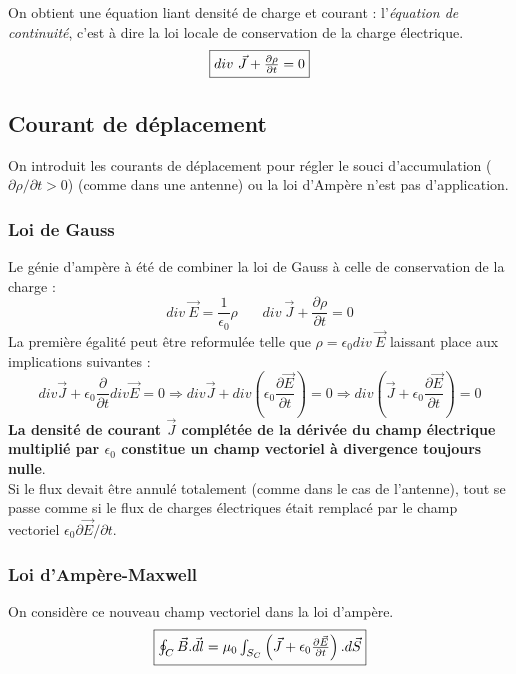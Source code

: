 \documentclass	[11pt, a4paper, openany]{book}
\begin{document}
On obtient une équation liant densité de charge et courant : l'\textit{équation de continuité}, c'est à dire la loi locale de conservation de la charge électrique.
\begin{equation}
\fbox{$div\ \vec{J} + \frac{\partial \rho}{\partial t} = 0 $}
\end{equation}

\subsection{Courant de déplacement}
On introduit les courants de déplacement pour régler le souci d'accumulation ($\partial\rho /  \partial t > 0$) (comme dans une antenne) ou la loi d'Ampère n'est pas d'application.

\subsubsection{Loi de Gauss}
Le génie d'ampère à été de combiner la loi de Gauss à celle de conservation de la charge : 
\begin{equation}
div\ \vec{E} = \frac{1}{\epsilon_0}\rho\ \ \ \ \ \ \ \ div\ \vec{J} + \frac{\partial \rho}{\partial t} = 0
\end{equation}
La première égalité peut être reformulée telle que $\rho = \epsilon_0div\ \vec{E}$ laissant place aux implications suivantes :
\begin{equation}
div\vec{J} + \epsilon_0 \frac{\partial}{\partial t}div\vec{E} = 0 \Rightarrow div\vec{J} + div\left(\epsilon_0\frac{\partial\vec{E}}{\partial t}\right) = 0 \Rightarrow div\left(\vec{J} + \epsilon_0\frac{\partial\vec{E}}{\partial t}\right) = 0
\end{equation}
\textbf{La densité de courant $\vec{J}$ complétée de la dérivée du champ électrique multiplié par $\epsilon_0$ constitue un champ vectoriel à divergence toujours nulle}.\\

Si le flux devait être annulé totalement (comme dans le cas de l'antenne), tout se passe comme si le flux de charges électriques était remplacé par le champ vectoriel $\epsilon_0 \partial\vec{E}/\partial t$.

\subsubsection{Loi d'Ampère-Maxwell}
On considère ce nouveau champ vectoriel dans la loi d'ampère.
\begin{equation}
\fbox{$ \oint_C \vec{B}.\vec{dl} = \mu_0   \int_{S_C}\left(\vec{J} + \epsilon_0 \frac{\partial \vec{E}}{\partial t}\right).d\vec{S}$}
\end{equation}
\end{document}
